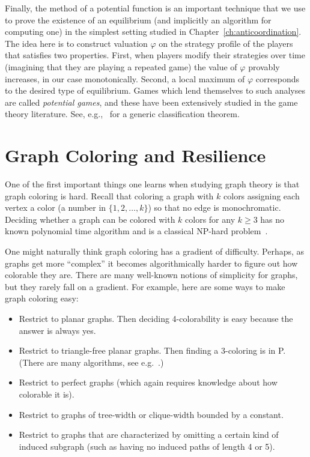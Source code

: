 Finally, the method of a potential function is an important technique that we
use to prove the existence of an equilibrium (and implicitly an algorithm for
computing one) in the simplest setting studied in
Chapter~\ref{ch:anticoordination}. The idea here is to construct valuation
$\varphi$ on the strategy profile of the players that satisfies two properties.
First, when players modify their strategies over time (imagining that they are
playing a repeated game) the value of $\varphi$ provably increases, in our case
monotonically. Second, a local maximum of $\varphi$ corresponds to the desired
type of equilibrium. Games which lend themselves to such analyses are called
\emph{potential games}, and these have been extensively studied in the game
theory literature. See, e.g.,~\cite{MondererS96} for a generic classification
theorem.

\section{Graph Coloring and Resilience}

One of the first important things one learns when studying graph theory is that
graph coloring is hard. Recall that coloring a graph with $k$ colors assigning
each vertex a color (a number in $\{ 1, 2, \dots, k \}$) so that no edge is
monochromatic. Deciding whether a graph can be colored with $k$ colors for any
$k \geq 3$ has no known polynomial time algorithm and is a classical NP-hard
problem~\cite{GareyJ79}.  

One might naturally think graph coloring has a gradient of difficulty. Perhaps,
as graphs get more ``complex'' it becomes algorithmically harder to figure out
how colorable they are. There are many well-known notions of simplicity for
graphs, but they rarely fall on a gradient. For example, here are some ways to
make graph coloring easy:

\begin{itemize}
\item Restrict to planar graphs. Then deciding 4-colorability is easy because
the answer is always yes.~\cite{AppelH77I,AppelH77II}

\item Restrict to triangle-free planar graphs. Then finding a 3-coloring is
in P. (There are many algorithms, see e.g.~\cite{DvovrakKT11}.)

\item Restrict to perfect graphs (which again requires knowledge about how
colorable it is).\cite{GrotschelLS12,HMM10}

\item Restrict to graphs of tree-width or clique-width bounded by a
constant.~\cite{Cai03}

\item Restrict to graphs that are characterized by omitting a certain kind of
induced subgraph (such as having no induced paths of length 4 or
5).~\cite{KKTW01}
\end{itemize}

